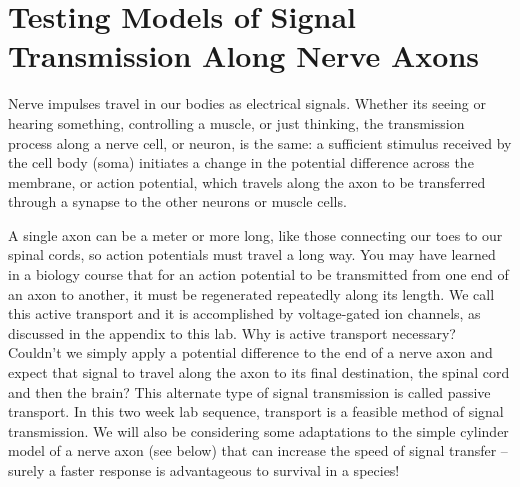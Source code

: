 \chapter{Testing Models of Signal Transmission Along Nerve Axons}
\thispagestyle{fancy}
%
Nerve impulses travel in our bodies as electrical signals. 
Whether its seeing or hearing something, controlling a muscle, or just thinking, the transmission process along a nerve cell, or neuron, is the same: a sufficient stimulus received by the cell body (soma) initiates a change in the potential difference across the membrane, or action potential, which travels along the axon to be transferred through a synapse to the other neurons or muscle cells. 
\par
A single axon can be a meter or more long, like those connecting our toes to our spinal cords, so action potentials must travel a long way.
You may have learned in a biology course that for an action potential to be transmitted from one end of an axon to another, it must be regenerated repeatedly along its length.
We call this active transport and it is accomplished by voltage-gated ion channels, as discussed in the appendix to this lab.
Why is active transport necessary?
Couldn't we simply apply a potential difference to the end of a nerve axon and expect that signal to travel along the axon to its final destination, the spinal cord and then the brain?
This alternate type of signal transmission is called passive transport. 
In this two week lab sequence, transport is a feasible method of signal transmission. 
We will also be considering some adaptations to the simple cylinder model of a nerve axon (see below) that can increase the speed of signal transfer – surely a faster response is advantageous to survival in a species!

